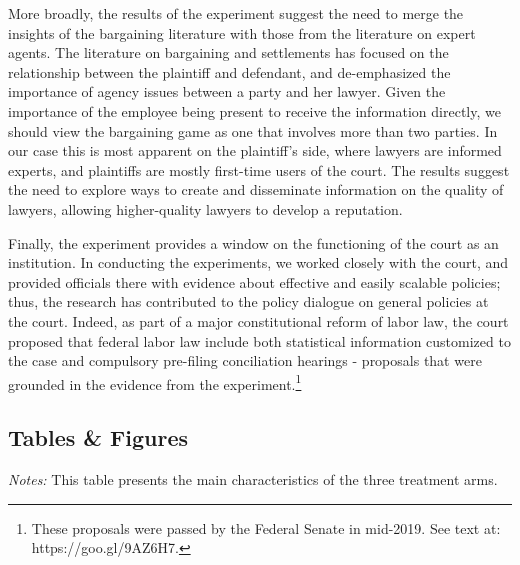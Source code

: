 \documentclass[11pt, a4paper]{article}
\begin{document}
More broadly, the results of the experiment suggest the need to merge the insights of the bargaining literature with those from the literature on expert agents. The literature on bargaining and settlements has focused on the relationship between the plaintiff and defendant, and de-emphasized the importance of agency issues between a party and her lawyer. Given the importance of the employee being present to receive the information directly, we should view the bargaining game as one that involves more than two parties.  In our case this is most apparent on the plaintiff's side, where lawyers are informed experts, and plaintiffs are mostly first-time users of the court. The results suggest the need to explore ways to create and disseminate information on the quality of lawyers, allowing higher-quality lawyers to develop a reputation. 

Finally, the experiment provides a window on the functioning of the court as an institution. In conducting the experiments, we worked closely with the court, and provided officials there with evidence about effective and easily scalable policies; thus, the research has contributed to the policy dialogue on general policies at the court. Indeed, as part of a major constitutional reform of labor law, the court proposed that federal labor law include both statistical information customized to the case and compulsory pre-filing conciliation hearings - proposals that were grounded in the evidence from the experiment.\footnote{These proposals were passed by the Federal Senate in mid-2019. See text at: https://goo.gl/9AZ6H7.}    








\newpage




\begin{landscape}
\section{Tables \& Figures}
\begin{table}[!ht]
    \caption{Description of Treatment Arms}
    \label{tab:TreatmentArms}
    \begin{center}
     {\fontsize{9}{10.30}\selectfont}
     \end{center}
    
     \scriptsize
\textit{Notes:} This table presents the main characteristics of the three treatment arms. 
\end{table}
\end{landscape} 
\end{document}
